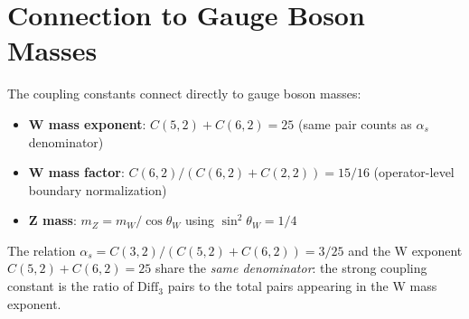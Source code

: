 \section{Connection to Gauge Boson Masses}
\label{sec:coupling_gauge_mass}

The coupling constants connect directly to gauge boson masses:
\begin{itemize}
\item \textbf{W mass exponent}: $C(5,2) + C(6,2) = 25$ (same pair counts as $\alpha_s$ denominator)
\item \textbf{W mass factor}: $C(6,2)/(C(6,2)+C(2,2)) = 15/16$ (operator-level boundary normalization)
\item \textbf{Z mass}: $m_Z = m_W / \cos\theta_W$ using $\sin^2\theta_W = 1/4$
\end{itemize}

The relation $\alpha_s = C(3,2)/(C(5,2)+C(6,2)) = 3/25$ and the W exponent $C(5,2)+C(6,2) = 25$
share the \emph{same denominator}: the strong coupling constant is the ratio of $\mathrm{Diff}_3$ pairs to the
total pairs appearing in the W mass exponent.

